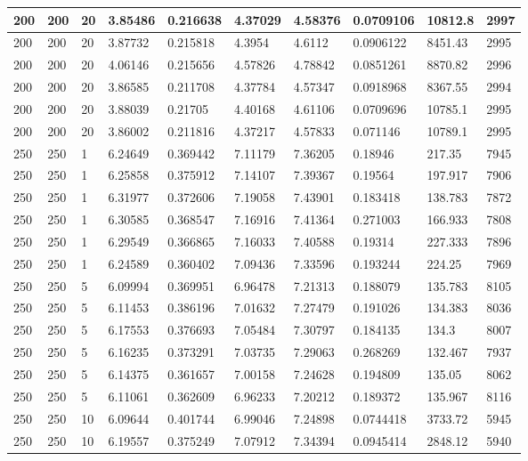 \begin{landscape}
\begin{longtable}{ | l | l | l | l | l | l | l | l | l | l | }
200 & 200 & 20 & 3.85486 & 0.216638 & 4.37029 & 4.58376 & 0.0709106 & 10812.8 & 2997\\ \hline
200 & 200 & 20 & 3.87732 & 0.215818 & 4.3954 & 4.6112 & 0.0906122 & 8451.43 & 2995\\ \hline
200 & 200 & 20 & 4.06146 & 0.215656 & 4.57826 & 4.78842 & 0.0851261 & 8870.82 & 2996\\ \hline
200 & 200 & 20 & 3.86585 & 0.211708 & 4.37784 & 4.57347 & 0.0918968 & 8367.55 & 2994\\ \hline
200 & 200 & 20 & 3.88039 & 0.21705 & 4.40168 & 4.61106 & 0.0709696 & 10785.1 & 2995\\ \hline
200 & 200 & 20 & 3.86002 & 0.211816 & 4.37217 & 4.57833 & 0.071146 & 10789.1 & 2995\\ \hline
250 & 250 & 1 & 6.24649 & 0.369442 & 7.11179 & 7.36205 & 0.18946 & 217.35 & 7945\\ \hline
250 & 250 & 1 & 6.25858 & 0.375912 & 7.14107 & 7.39367 & 0.19564 & 197.917 & 7906\\ \hline
250 & 250 & 1 & 6.31977 & 0.372606 & 7.19058 & 7.43901 & 0.183418 & 138.783 & 7872\\ \hline
250 & 250 & 1 & 6.30585 & 0.368547 & 7.16916 & 7.41364 & 0.271003 & 166.933 & 7808\\ \hline
250 & 250 & 1 & 6.29549 & 0.366865 & 7.16033 & 7.40588 & 0.19314 & 227.333 & 7896\\ \hline
250 & 250 & 1 & 6.24589 & 0.360402 & 7.09436 & 7.33596 & 0.193244 & 224.25 & 7969\\ \hline
250 & 250 & 5 & 6.09994 & 0.369951 & 6.96478 & 7.21313 & 0.188079 & 135.783 & 8105\\ \hline
250 & 250 & 5 & 6.11453 & 0.386196 & 7.01632 & 7.27479 & 0.191026 & 134.383 & 8036\\ \hline
250 & 250 & 5 & 6.17553 & 0.376693 & 7.05484 & 7.30797 & 0.184135 & 134.3 & 8007\\ \hline
250 & 250 & 5 & 6.16235 & 0.373291 & 7.03735 & 7.29063 & 0.268269 & 132.467 & 7937\\ \hline
250 & 250 & 5 & 6.14375 & 0.361657 & 7.00158 & 7.24628 & 0.194809 & 135.05 & 8062\\ \hline
250 & 250 & 5 & 6.11061 & 0.362609 & 6.96233 & 7.20212 & 0.189372 & 135.967 & 8116\\ \hline
250 & 250 & 10 & 6.09644 & 0.401744 & 6.99046 & 7.24898 & 0.0744418 & 3733.72 & 5945\\ \hline
250 & 250 & 10 & 6.19557 & 0.375249 & 7.07912 & 7.34394 & 0.0945414 & 2848.12 & 5940\\ \hline

\end{longtable}
\end{landscape}
